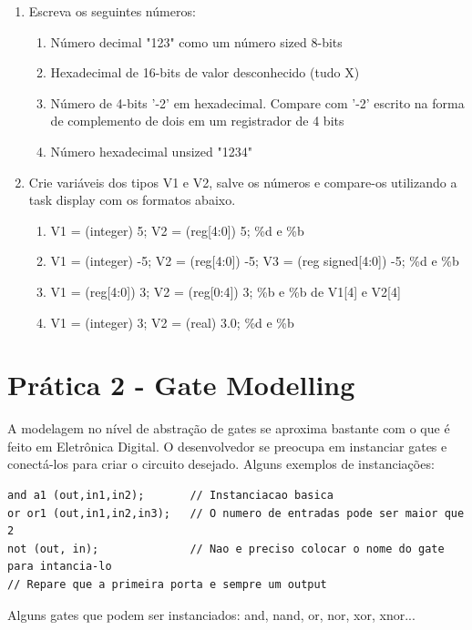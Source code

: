 \documentclass[a4paper]{article}
\begin{document}
\begin{enumerate}
\item Escreva os seguintes números:
		\begin{enumerate}
	  	\item Número decimal "123" como um número sized 8-bits
	  	\item Hexadecimal de 16-bits de valor desconhecido (tudo X)
        \item Número de 4-bits '-2' em hexadecimal. Compare com '-2' escrito na forma de complemento de dois em um registrador de 4 bits
       	\item Número hexadecimal unsized "1234"
		\end{enumerate}
\item Crie variáveis dos tipos V1 e V2, salve os números e compare-os utilizando a task display com os formatos abaixo.
        \begin{enumerate}
        \item V1 = (integer) 5; V2 = (reg[4:0]) 5; \%d e \%b
        \item V1 = (integer) -5; V2 = (reg[4:0]) -5; V3 = (reg signed[4:0]) -5; \%d e \%b
        \item V1 = (reg[4:0]) 3; V2 = (reg[0:4]) 3; \%b e \%b de V1[4] e V2[4]
        \item V1 = (integer) 3; V2 = (real) 3.0; \%d e \%b
        \end{enumerate}
	  	
\end{enumerate}

\section*{Prática 2 - Gate Modelling}

A modelagem no nível de abstração de gates se aproxima bastante com o que é feito em Eletrônica Digital. O desenvolvedor se preocupa em instanciar gates e conectá-los para criar o circuito desejado. Alguns exemplos de instanciações:
\begin{lstlisting}[style={verilog-style-nolinenumber}]
and a1 (out,in1,in2);		// Instanciacao basica
or or1 (out,in1,in2,in3);	// O numero de entradas pode ser maior que 2
not (out, in);				// Nao e preciso colocar o nome do gate para intancia-lo
// Repare que a primeira porta e sempre um output
\end{lstlisting}

Alguns gates que podem ser instanciados:  and, nand, or, nor, xor, xnor...
\end{document}
